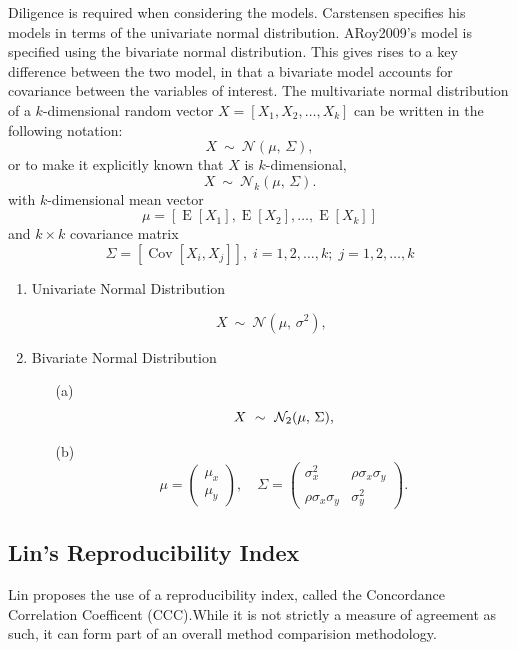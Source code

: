 \documentclass[12pt, a4paper]{report}
\theoremstyle{plain}
\theoremstyle{definition}
\theoremstyle{remark}
\begin{document}
	Diligence is required when considering the models. Carstensen specifies his models in terms of the univariate normal distribution. ARoy2009's model is specified using the bivariate normal distribution.
	This gives rises to a key difference between the two model, in that a bivariate model accounts for covariance between the variables of interest.
	The multivariate normal distribution of a $k$-dimensional random vector $X = [X_1, X_2, \ldots, X_k]$
	can be written in the following notation:
	\[
	X\ \sim\ \mathcal{N}(\mu,\, \Sigma),
	\]
	or to make it explicitly known that $X$ is $k$-dimensional,
	\[
	X\ \sim\ \mathcal{N}_k(\mu,\, \Sigma).
	\]
	with $k$-dimensional mean vector
	\[ \mu = [ \operatorname{E}[X_1], \operatorname{E}[X_2], \ldots, \operatorname{E}[X_k]] \]
	and $k \times k$ covariance matrix
	\[ \Sigma = [\operatorname{Cov}[X_i, X_j]], \; i=1,2,\ldots,k; \; j=1,2,\ldots,k \]
	
	\bigskip
	
	\begin{enumerate}
		\item Univariate Normal Distribution
		
		\[
		X\ \sim\ \mathcal{N}(\mu,\, \sigma^2),
		\]
		
		\item Bivariate Normal Distribution
		
		\begin{itemize}
			\item[(a)] \[  X\ \sim\ \mathcal{N}_2(\mu,\, \Sigma), \vspace{1cm}\]
			\item[(b)] \[    \mu = \begin{pmatrix} \mu_x \\ \mu_y \end{pmatrix}, \quad
			\Sigma = \begin{pmatrix} \sigma_x^2 & \rho \sigma_x \sigma_y \\
			\rho \sigma_x \sigma_y  & \sigma_y^2 \end{pmatrix}.\]
		\end{itemize}
	\end{enumerate}
	
	
	
	\subsection{Lin's Reproducibility Index} Lin proposes the use of a
	reproducibility index, called the Concordance Correlation
	Coefficent (CCC).While it is not strictly a measure of agreement
	as such, it can form part of an overall method comparision
	methodology.
	
\end{document}
